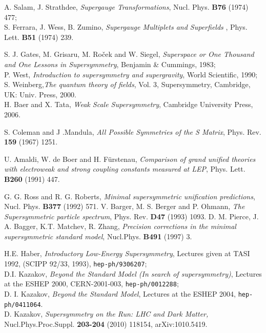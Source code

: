 \documentclass{cernyrep}
\begin{document}
\begin{thebibliography}{100}
A. Salam, J. Strathdee, {\em Supergauge Transformations}, Nucl. Phys.  {\bf B76} (1974) 477;\\
S. Ferrara, J. Wess, B. Zumino, {\em Supergauge Multiplets and Superfields }, Phys. Lett. {\bf B51} (1974) 239.

S. J. Gates, M. Grisaru, M. Ro\v{c}ek and W. Siegel,
{\em Superspace or One Thousand and One Lessons in
Supersymmetry}, Benjamin \& Cummings, 1983;\\
P. West, {\em Introduction to supersymmetry and supergravity},
World Scientific, 1990;\\
S. Weinberg,{\em  The quantum theory of fields},  Vol. 3, Supersymmetry, Cambridge,
UK: Univ. Press, 2000.\\
H. Baer and X. Tata,
{\em Weak Scale Supersymmetry}, Cambridge University Press, 2006.

S. Coleman and J .Mandula,
{\em All Possible Symmetries of the S Matrix}, Phys. Rev. {\bf 159} (1967) 1251.

U. Amaldi, W. de Boer and H. F\"urstenau,
{\em Comparison of grand unified theories with electroweak and strong coupling constants measured at LEP}, Phys. Lett. {\bf B260} (1991) 447.

 G. G. Ross and R. G. Roberts, {\it Minimal supersymmetric unification predictions}, Nucl. Phys. {\bf B377} (1992) 571.
V. Barger, M. S. Berger and P. Ohmann, {\it The Supersymmetric particle spectrum}, Phys. Rev. {\bf D47} (1993) 1093.
D. M. Pierce, J. A. Bagger, K.T. Matchev, R. Zhang, {\it Precision corrections in the minimal supersymmetric standard model}, Nucl.Phys. {\bf B491} (1997) 3.

H.E. Haber, {\em Introductory Low-Energy Supersymmetry},
Lectures given at TASI 1992, (SCIPP 92/33, 1993),
\texttt{hep-ph/9306207};\\
D.I. Kazakov,
{\em Beyond the Standard Model (In search of supersymmetry)},
Lectures at the ESHEP 2000, CERN-2001-003,
\texttt{hep-ph/0012288};\\
D. I. Kazakov,
\textit{Beyond the Standard Model}, 
Lectures at the ESHEP 2004, 
\texttt{hep-ph/0411064}.\\
D. Kazakov, {\em Supersymmetry on the Run: LHC and Dark Matter,} Nucl.Phys.Proc.Suppl.
{\bf 203-204} (2010) 118154, arXiv:1010.5419.


\end{thebibliography}
\end{document}
